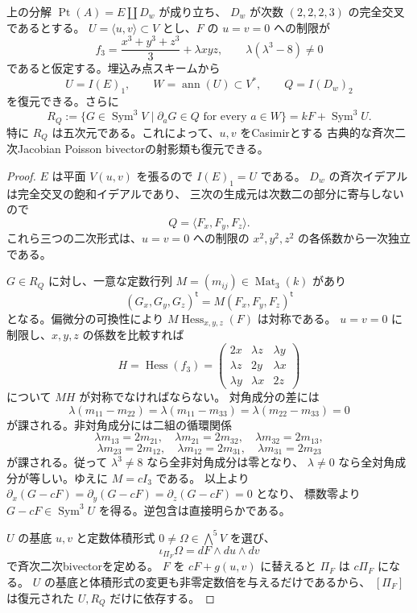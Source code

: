 \begin{proposition}[古典Casimir三次空間の復元]
\label{prop:point-gradient-reconstruction}
上の分解 $\operatorname{Pt}(A)=E\amalg D_w$ が成り立ち、
$D_w$ が次数 $(2,2,2,3)$ の完全交叉であるとする。
$U=\langle u,v\rangle\subset V$ とし、$F$ の $u=v=0$ への制限が
\[
 f_3=\frac{x^3+y^3+z^3}{3}+\lambda xyz,
 \qquad \lambda(\lambda^3-8)\ne0
\]
であると仮定する。埋込み点スキームから
\[
 U=I(E)_1,\qquad W=\operatorname{ann}(U)\subset V^*,
 \qquad Q=I(D_w)_2
\]
を復元できる。さらに
\[
 R_Q:=\{G\in\operatorname{Sym}^3V\mid
              \partial_aG\in Q\text{ for every }a\in W\}
       =kF+\operatorname{Sym}^3U.
\]
特に $R_Q$ は五次元である。これによって、$u,v$ をCasimirとする
古典的な斉次二次Jacobian Poisson bivectorの射影類も復元できる。
\end{proposition}
\begin{proof}
$E$ は平面 $V(u,v)$ を張るので $I(E)_1=U$ である。
$D_w$ の斉次イデアルは完全交叉の飽和イデアルであり、
三次の生成元は次数二の部分に寄与しないので
\[
 Q=\langle F_x,F_y,F_z\rangle.
\]
これら三つの二次形式は、$u=v=0$ への制限の
$x^2,y^2,z^2$ の各係数から一次独立である。

$G\in R_Q$ に対し、一意な定数行列 $M=(m_{ij})\in\operatorname{Mat}_3(k)$ があり
\[
 (G_x,G_y,G_z)^{\mathsf t}=M(F_x,F_y,F_z)^{\mathsf t}
\]
となる。偏微分の可換性により $M\operatorname{Hess}_{x,y,z}(F)$ は対称である。
$u=v=0$ に制限し、$x,y,z$ の係数を比較すれば
\[
 H=\operatorname{Hess}(f_3)=
 \begin{pmatrix}
  2x&\lambda z&\lambda y\\
  \lambda z&2y&\lambda x\\
  \lambda y&\lambda x&2z
 \end{pmatrix}
\]
について $MH$ が対称でなければならない。
対角成分の差には
\[
 \lambda(m_{11}-m_{22})=
 \lambda(m_{11}-m_{33})=
 \lambda(m_{22}-m_{33})=0
\]
が課される。非対角成分には二組の循環関係
\[
 \lambda m_{13}=2m_{21},\quad
 \lambda m_{21}=2m_{32},\quad
 \lambda m_{32}=2m_{13},
\]
\[
 \lambda m_{23}=2m_{12},\quad
 \lambda m_{12}=2m_{31},\quad
 \lambda m_{31}=2m_{23}
\]
が課される。従って $\lambda^3\ne8$ なら全非対角成分は零となり、
$\lambda\ne0$ なら全対角成分が等しい。ゆえに $M=cI_3$ である。
以上より $\partial_x(G-cF)=\partial_y(G-cF)=\partial_z(G-cF)=0$ となり、
標数零より $G-cF\in\operatorname{Sym}^3U$ を得る。逆包含は直接明らかである。

$U$ の基底 $u,v$ と定数体積形式 $0\ne\Omega\in\bigwedge^5V$ を選び、
\[
 \iota_{\Pi_F}\Omega=dF\wedge du\wedge dv
\]
で斉次二次bivectorを定める。
$F$ を $cF+g(u,v)$ に替えると $\Pi_F$ は $c\Pi_F$ になる。
$U$ の基底と体積形式の変更も非零定数倍を与えるだけであるから、
$[\Pi_F]$ は復元された $U,R_Q$ だけに依存する。
\end{proof}

